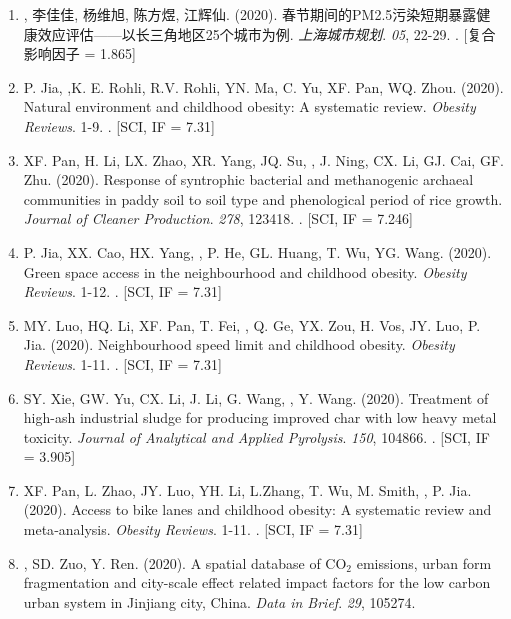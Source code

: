 \begin{enumerate}
\item
    {}, 李佳佳, 杨维旭, 陈方煜, 江辉仙. (2020).
    春节期间的PM2.5污染短期暴露健康效应评估——以长三角地区25个城市为例.
    \textit{上海城市规划}. \textit{05}, 22-29.
    . [复合影响因子 = 1.865] 
\item
    P. Jia, \Shaoqing,K. E. Rohli, R.V. Rohli, YN. Ma, C. Yu, XF. Pan, WQ. Zhou. (2020).
    Natural environment and childhood obesity: A systematic review.
    \textit{Obesity Reviews}. 1-9.
    . [SCI, IF = 7.31]
\item
    XF. Pan, H. Li, LX. Zhao, XR. Yang, JQ. Su, \Shaoqing, J. Ning, CX. Li, GJ. Cai, GF. Zhu. (2020).
    Response of syntrophic bacterial and methanogenic archaeal communities in paddy soil to soil type and phenological period of rice growth.
    \textit{Journal of Cleaner Production}. \textit{278}, 123418.
    . [SCI, IF = 7.246]
\item
    P. Jia, XX. Cao, HX. Yang, \Shaoqing, P. He, GL. Huang, T. Wu, YG. Wang. (2020).
    Green space access in the neighbourhood and childhood obesity.
    \textit{Obesity Reviews}. 1-12.
    . [SCI, IF = 7.31]
\item
    MY. Luo, HQ. Li, XF. Pan, T. Fei, \Shaoqing, Q. Ge, YX. Zou, H. Vos, JY. Luo, P. Jia. (2020).
    Neighbourhood speed limit and childhood obesity.
    \textit{Obesity Reviews}. 1-11.
    . [SCI, IF = 7.31]
\item
    SY. Xie, GW. Yu, CX. Li, J. Li, G. Wang, \Shaoqing, Y. Wang. (2020).
    Treatment of high-ash industrial sludge for producing improved char with low heavy metal toxicity.
    \textit{Journal of Analytical and Applied Pyrolysis}. \textit{150}, 104866.
    . [SCI, IF = 3.905]
\item
    XF. Pan, L. Zhao, JY. Luo, YH. Li, L.Zhang, T. Wu, M. Smith, \Shaoqing, P. Jia. (2020).
    Access to bike lanes and childhood obesity: A systematic review and meta‐analysis.
    \textit{Obesity Reviews}. 1-11.
    . [SCI, IF = 7.31]
\item
    \Shaoqing, SD. Zuo, Y. Ren. (2020).
    A spatial database of CO$_2$ emissions, urban form fragmentation and city-scale effect related impact factors for the low carbon urban system in Jinjiang city, China.
    \textit{Data in Brief}. \textit{29}, 105274.

\end{enumerate}
